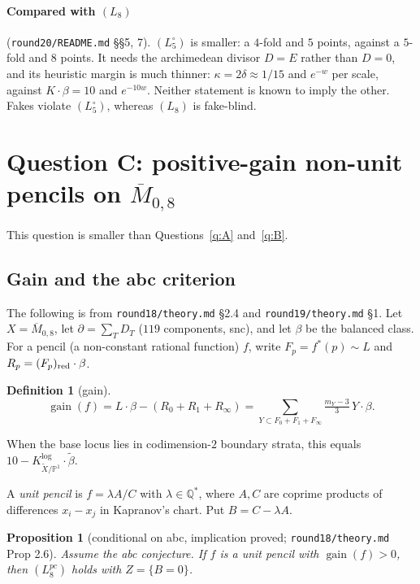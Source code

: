 \documentclass[11pt]{article}
\newtheorem{proposition}[theorem]{Proposition}
\newtheorem{definition}[theorem]{Definition}
\newcommand{\Q}{\mathbb Q}
\newcommand{\PP}{\mathbb P}
\newcommand{\Mbar}{\overline M_{0,8}}
\newcommand{\gain}{\operatorname{gain}}
\newcommand{\rec}[1]{\texttt{#1}}
\begin{document}
\paragraph{Compared with \((L_8)\)} (\rec{round20/README.md} \S\S5, 7).
\((L_5^\circ)\) is smaller: a \(4\)-fold and \(5\) points, against a
\(5\)-fold and \(8\) points.  It needs the archimedean divisor \(D=E\) rather
than \(D=0\), and its heuristic margin is much thinner:
\(\kappa=2\delta\approx1/15\) and \(e^{-w}\) per scale, against
\(K\cdot\beta=10\) and \(e^{-10w}\).  Neither statement is known to imply the
other.  Fakes violate \((L_5^\circ)\), whereas \((L_8)\) is fake-blind.

\section{Question C: positive-gain non-unit pencils on \texorpdfstring{\(\Mbar\)}{M0,8}}\label{sec:C}

This question is smaller than Questions~\ref{q:A} and~\ref{q:B}.

\subsection{Gain and the abc criterion}

The following is from \rec{round18/theory.md} \S2.4 and
\rec{round19/theory.md} \S1.  Let \(X=\Mbar\), let \(\partial=\sum_TD_T\)
(\(119\) components, snc), and let \(\beta\) be the balanced class.  For a
pencil (a non-constant rational function) \(f\), write \(F_p=f^*(p)\sim L\) and
\(R_p=(F_p)_{\rm red}\cdot\beta\).

\begin{definition}[gain]
\[
  \gain(f)=L\cdot\beta-(R_0+R_1+R_\infty)
  =\sum_{Y\subset F_0+F_1+F_\infty}\tfrac{m_Y-3}{3}\,Y\cdot\beta .
\]
\end{definition}

When the base locus lies in codimension-\(2\) boundary strata, this equals
\(10-K^{\log}_{\tilde X/\PP^1}\cdot\tilde\beta\).

A \emph{unit pencil} is \(f=\lambda A/C\) with \(\lambda\in\Q^*\), where
\(A,C\) are coprime products of differences \(x_i-x_j\) in Kapranov's chart.
Put \(B=C-\lambda A\).

\begin{proposition}[conditional on abc, implication proved; \rec{round18/theory.md} Prop 2.6]\label{prop:abc}
Assume the abc conjecture.  If \(f\) is a unit pencil with \(\gain(f)>0\), then
\((L_8^{pc})\) holds with \(Z=\{B=0\}\).
\end{proposition}
\end{document}
